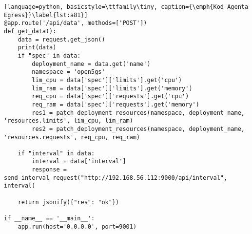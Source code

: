 \begin{lstlisting}[language=python, basicstyle=\ttfamily\tiny, caption={\emph{Kod Agenta Egress}}\label{lst:a81}]
@app.route('/api/data', methods=['POST'])
def get_data():
    data = request.get_json()
    print(data)
    if "spec" in data:
        deployment_name = data.get('name')
        namespace = 'open5gs'
        lim_cpu = data['spec']['limits'].get('cpu')
        lim_ram = data['spec']['limits'].get('memory')
        req_cpu = data['spec']['requests'].get('cpu')
        req_ram = data['spec']['requests'].get('memory')
        res1 = patch_deployment_resources(namespace, deployment_name, 'resources.limits', lim_cpu, lim_ram)
        res2 = patch_deployment_resources(namespace, deployment_name, 'resources.requests', req_cpu, req_ram)

    if "interval" in data:
        interval = data['interval']
        response = send_interval_request("http://192.168.56.112:9000/api/interval", interval)
    
    return jsonify({"res": "ok"})

if __name__ == '__main__':
    app.run(host='0.0.0.0', port=9001)
\end{lstlisting}